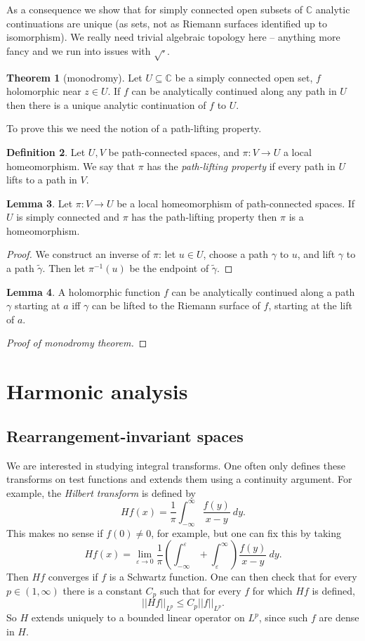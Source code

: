 \documentclass[12pt]{report}
\newcommand{\CC}{\mathbb{C}}
\newcommand{\dfn}[1]{\emph{#1}\index{#1}}
\theoremstyle{definition}
\newtheorem{theorem}{Theorem}[chapter]
\newtheorem{lemma}[theorem]{Lemma}
\newtheorem{definition}[theorem]{Definition}
\begin{document}
As a consequence we show that for simply connected open subsets of $\CC$ analytic continuations are unique (as sets, not as Riemann surfaces identified up to isomorphism).
We really need trivial algebraic topology here -- anything more fancy and we run into issues with $\sqrt\cdot$.
\begin{theorem}[monodromy]
Let $U \subseteq \CC$ be a simply connected open set, $f$ holomorphic near $z \in U$.
If $f$ can be analytically continued along any path in $U$ then there is a unique analytic continuation of $f$ to $U$.
\end{theorem}
To prove this we need the notion of a path-lifting property.
\begin{definition}
Let $U,V$ be path-connected spaces, and $\pi: V \to U$ a local homeomorphism.
We say that $\pi$ has the \dfn{path-lifting property} if every path in $U$ lifts to a path in $V$.
\end{definition}
\begin{lemma}
Let $\pi: V \to U$ be a local homeomorphism of path-connected spaces. If $U$ is simply connected and $\pi$ has the path-lifting property then $\pi$ is a homeomorphism.
\end{lemma}
\begin{proof}
We construct an inverse of $\pi$: let $u \in U$, choose a path $\gamma$ to $u$, and lift $\gamma$ to a path $\widetilde \gamma$.
Then let $\pi^{-1}(u)$ be the endpoint of $\widetilde \gamma$.
\end{proof}
\begin{lemma}
A holomorphic function $f$ can be analytically continued along a path $\gamma$ starting at $a$ iff $\gamma$ can be lifted to the Riemann surface of $f$, starting at the lift of $a$.
\end{lemma}


\begin{proof}[Proof of monodromy theorem]


\end{proof}


\part{Harmonic analysis}
\chapter{Rearrangement-invariant spaces}
We are interested in studying integral transforms. One often only defines these transforms on test functions and extends them using a continuity argument. For example, the \dfn{Hilbert transform} is defined by
$$Hf(x) = \frac{1}{\pi}\int_{-\infty}^\infty \frac{f(y)}{x-y}~dy.$$
This makes no sense if $f(0) \neq 0$, for example, but one can fix this by taking
$$Hf(x) = \lim_{\varepsilon \to 0} \frac{1}{\pi} \left(\int_{-\infty}^\varepsilon + \int_\varepsilon^\infty\right) \frac{f(y)}{x-y}~dy.$$
Then $Hf$ converges if $f$ is a Schwartz function. One can then check that for every $p \in (1, \infty)$ there is a constant $C_p$ such that for every $f$ for which $Hf$ is defined,
$$||Hf||_{L^p} \leq C_p ||f||_{L^p}.$$
So $H$ extends uniquely to a bounded linear operator on $L^p$, since such $f$ are dense in $H$.
\end{document}
